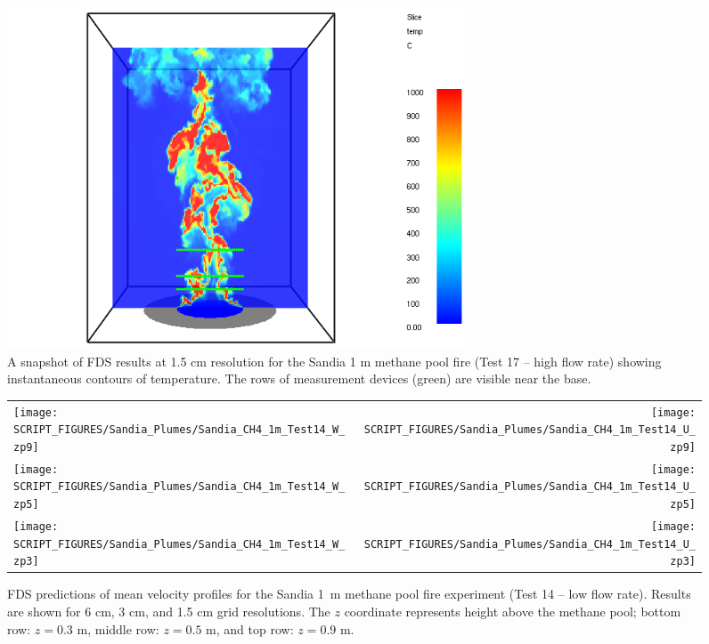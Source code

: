 \begin{figure}[h]
\begin{center}
\includegraphics[height=4in]{FIGURES/Sandia_Plumes/Sandia_CH4_1m_image}
\caption[Sandia 1~m methane pool fire instantaneous temperature contours.]{A snapshot of FDS results at 1.5 cm resolution for the Sandia 1 m methane pool fire (Test 17 -- high flow rate) showing instantaneous contours of temperature.  The rows of measurement devices (green) are visible near the base.}
\label{Sandia_CH4_1m_image}
\end{center}
\end{figure}

\newpage

\begin{figure}[p]
\begin{tabular*}{\textwidth}{l@{\extracolsep{\fill}}r}
\texttt{[image: SCRIPT\_FIGURES/Sandia\_Plumes/Sandia\_CH4\_1m\_Test14\_W\_zp9]} &
\texttt{[image: SCRIPT\_FIGURES/Sandia\_Plumes/Sandia\_CH4\_1m\_Test14\_U\_zp9]} \\
\texttt{[image: SCRIPT\_FIGURES/Sandia\_Plumes/Sandia\_CH4\_1m\_Test14\_W\_zp5]} &
\texttt{[image: SCRIPT\_FIGURES/Sandia\_Plumes/Sandia\_CH4\_1m\_Test14\_U\_zp5]} \\
\texttt{[image: SCRIPT\_FIGURES/Sandia\_Plumes/Sandia\_CH4\_1m\_Test14\_W\_zp3]} &
\texttt{[image: SCRIPT\_FIGURES/Sandia\_Plumes/Sandia\_CH4\_1m\_Test14\_U\_zp3]}
\end{tabular*}
\caption[Sandia 1~m methane pool fire (Test 14) mean velocity profiles]
{FDS predictions of mean velocity profiles for the Sandia 1~m methane pool fire experiment (Test 14 -- low flow rate). Results are shown for 6 cm, 3 cm, and 1.5 cm grid resolutions. The $z$ coordinate represents height above the methane pool; bottom row: $z=0.3$ m, middle row: $z=0.5$ m, and top row: $z=0.9$ m.}
\label{Sandia_CH4_1m_Test14_velocity}
\end{figure}

